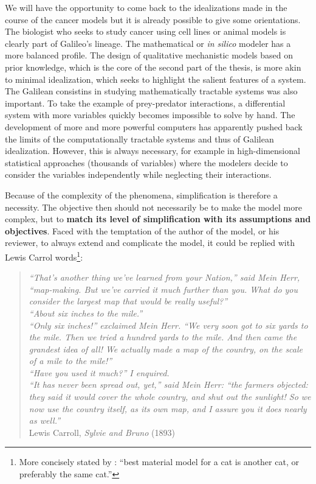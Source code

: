 \documentclass[a4paper,12pt,twoside,onecolumn,openright,final,oldfontcommands]{memoir}
\begin{document}
We will have the opportunity to come back to the idealizations made in
the course of the cancer models but it is already possible to give some
orientations. The biologist who seeks to study cancer using cell lines
or animal models is clearly part of Galileo's lineage. The mathematical
or \emph{in silico} modeler has a more balanced profile. The design of
qualitative mechanistic models based on prior knowledge, which is the
core of the second part of the thesis, is more akin to minimal
idealization, which seeks to highlight the salient features of a system.
The Galilean consistins in studying mathematically tractable systems was
also important. To take the example of prey-predator interactions, a
differential system with more variables quickly becomes impossible to
solve by hand. The development of more and more powerful computers has
apparently pushed back the limits of the computationally tractable
systems and thus of Galilean idealization. However, this is always
necessary, for example in high-dimensional statistical approaches
(thousands of variables) where the modelers decide to consider the
variables independently while neglecting their interactions.

Because of the complexity of the phenomena, simplification is therefore
a necessity. The objective then should not necessarily be to make the
model more complex, but to \textbf{match its level of simplification
with its assumptions and objectives}. Faced with the temptation of the
author of the model, or his reviewer, to always extend and complicate
the model, it could be replied with Lewis Carrol words\footnote{More
  concisely stated by \citet{rosenblueth1945role}: ``best material model
  for a cat is another cat, or preferably the same cat.''}:

\begin{quote}
\emph{``That's another thing we've learned from your Nation,'' said Mein
Herr, ``map-making. But we've carried it much further than you. What do
you consider the largest map that would be really useful?''}\\
\emph{``About six inches to the mile.''}\\
\emph{``Only six inches!'' exclaimed Mein Herr. ``We very soon got to
six yards to the mile. Then we tried a hundred yards to the mile. And
then came the grandest idea of all! We actually made a map of the
country, on the scale of a mile to the mile!''}\\
\emph{``Have you used it much?'' I enquired.}\\
\emph{``It has never been spread out, yet,'' said Mein Herr: ``the
farmers objected: they said it would cover the whole country, and shut
out the sunlight! So we now use the country itself, as its own map, and
I assure you it does nearly as well.''}\\
Lewis Carroll, \emph{Sylvie and Bruno} (1893)
\end{quote}
\end{document}
